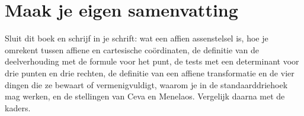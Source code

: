 \begin{oefeningen}


\end{oefeningen}


\begin{oefeningen}






\end{oefeningen}


\ifzelfstudie
\section*{Maak je eigen samenvatting}
Sluit dit boek en schrijf in je schrift: wat een affien assenstelsel is, hoe je omrekent tussen affiene en cartesische coördinaten, de definitie van de deelverhouding met de formule voor het punt, de tests met een determinant voor drie punten en drie rechten, de definitie van een affiene transformatie en de vier dingen die ze bewaart of vermenigvuldigt, waarom je in de standaarddriehoek mag werken, en de stellingen van Ceva en Menelaos. Vergelijk daarna met de kaders.
\fi
